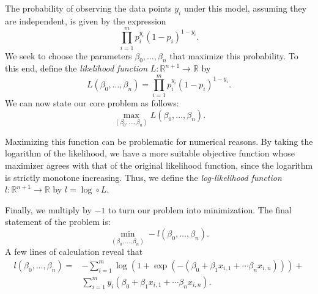 The probability of observing the data points $y_i$ under this model, assuming they are independent, is given by
the expression
$$
\prod_{i=1}^m p_i^{y_i}(1-p_i)^{1-y_i}.
$$
We seek to choose the parameters $\beta_0, \ldots, \beta_n$ that maximize this probability.
To this end, define the \emph{likelihood function} $L:\mathbb{R}^{n+1} \rightarrow \mathbb{R}$ by
$$
L(\beta_0, \ldots, \beta_n) = \prod_{i=1}^m p_i^{y_i}(1-p_i)^{1-y_i}.
$$
We can now state our core problem as follows:
$$
\max_{(\beta_0,\ldots,\beta_n)}L(\beta_0, \ldots, \beta_n).
$$

Maximizing this function can be problematic for numerical reasons. By taking the logarithm of the likelihood,
we have a more suitable objective function whose maximizer agrees with that of the original likelihood function, 
since the logarithm is strictly monotone increasing. Thus, we define the \emph{log-likelihood function}
$l : \mathbb{R}^{n+1} \rightarrow \mathbb{R}$ by $l = \log \circ L$.

Finally, we multiply by $-1$ to turn our problem into minimization. The final statement of the problem is:
$$
\min_{(\beta_0,\ldots,\beta_n)}-l(\beta_0, \ldots, \beta_n).
$$
A few lines of calculation reveal that
\begin{align*}
l(\beta_0,\ldots,\beta_n) = &-\sum_{i=1}^{m}\log(1+\exp(-(\beta_0 + \beta_1x_{i,1} + \cdots \beta_nx_{i,n}))) +\\
 &\sum_{i=1}^m y_i(\beta_0 + \beta_1x_{i,1} + \cdots \beta_nx_{i,n}).
\end{align*}






